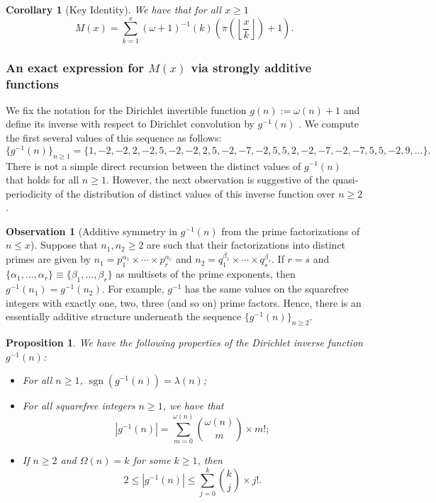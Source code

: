 \documentclass[11pt,reqno,a4letter]{article}
\numberwithin{figure}{section}
\numberwithin{table}{section}
\newcommand{\seqnum}[1]{\href{http://oeis.org/#1}{\color{ProcessBlue}{\underline{#1}}}}
\newcommand{\Floor}[2]{\ensuremath{\left\lfloor \frac{#1}{#2} \right\rfloor}}
\theoremstyle{plain}
\newtheorem{prop}[theorem]{Proposition}
\newtheorem{cor}[theorem]{Corollary}
\numberwithin{theorem}{section}
\theoremstyle{definition}
\newtheorem{observation}[theorem]{Observation}
\begin{document}
\begin{cor}[Key Identity] 
\label{cor_Mx_gInvnPixk_formula} 
We have that for all $x \geq 1$ 
\begin{equation} 
\label{eqn_Mx_gInvnPixk_formula} 
M(x) = \sum_{k=1}^{x} (\omega+1)^{-1}(k) \left(\pi\left(\Floor{x}{k}\right) + 1\right). 
\end{equation} 
\end{cor} 

\subsubsection{An exact expression for $M(x)$ via strongly additive functions} 
\label{example_InvertingARecRelForMx_Intro}

We fix the notation for the Dirichlet invertible function $g(n) := \omega(n) + 1$ and define its 
inverse with respect to Dirichlet convolution by $g^{-1}(n)$ 
\cite[\seqnum{A341444}]{OEIS}. 
We compute the first several values of this sequence as follows: 
\[
\{g^{-1}(n)\}_{n \geq 1} = \{1, -2, -2, 2, -2, 5, -2, -2, 2, 5, -2, -7, -2, 5, 5, 2, -2, -7, -2, 
     -7, 5, 5, -2, 9, \ldots \}. 
\] 
There is not a simple 
direct recursion between the distinct values of $g^{-1}(n)$ that holds for all $n \geq 1$. 
However, the next observation is suggestive of the quasi-periodicity of the distribution of 
distinct values of this inverse function over $n \geq 2$. 

\begin{observation}[Additive symmetry in $g^{-1}(n)$ from the prime factorizations of $n \leq x$] 
\label{heuristic_SymmetryIngInvFuncs} 
Suppose that $n_1, n_2 \geq 2$ are such that their factorizations into distinct primes are 
given by $n_1 = p_1^{\alpha_1} \times \cdots \times p_r^{\alpha_r}$ and 
$n_2 = q_1^{\beta_1} \times \cdots \times q_s^{\beta_s}$. 
If $r = s$ and $\{\alpha_1, \ldots, \alpha_r\} \equiv \{\beta_1, \ldots, \beta_r\}$ 
as multisets of the prime exponents, 
then $g^{-1}(n_1) = g^{-1}(n_2)$. For example, $g^{-1}$ has the same values on the squarefree integers 
with exactly one, two, three (and so on) prime factors. 
Hence, there is an essentially additive structure underneath the sequence 
$\{g^{-1}(n)\}_{n \geq 2}$. 
\end{observation} 

\begin{prop} 
\label{lemma_gInv_MxExample} 
We have the following properties of the 
Dirichlet inverse function $g^{-1}(n)$: 
\begin{itemize} 

\item[(A)] For all $n \geq 1$, $\operatorname{sgn}(g^{-1}(n)) = \lambda(n)$; 
\item[(B)] For all squarefree integers $n \geq 1$, we have that 
     \[
     |g^{-1}(n)| = \sum_{m=0}^{\omega(n)} \binom{\omega(n)}{m} \times m!; 
     \]
\item[(C)] If $n \geq 2$ and $\Omega(n) = k$ for some $k \geq 1$, then 
     \[
     2 \leq |g^{-1}(n)| \leq \sum_{j=0}^{k} \binom{k}{j} \times j!. 
     \]
\end{itemize} 
\end{prop} 
\end{document}
